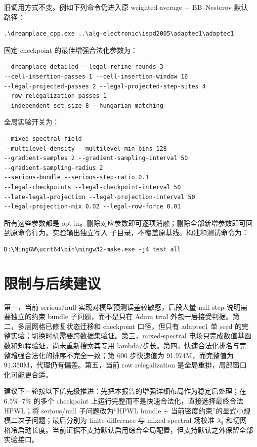 \documentclass[11pt,a4paper]{ctexart}
\newcommand{\code}[1]{\texttt{\detokenize{#1}}}
\begin{document}
旧调用方式不变。例如下列命令仍进入原 weighted-average + BB--Nesterov 默认路径：
\begin{verbatim}
.\dreamplace_cpp.exe ..\alg-electronic\ispd2005\adaptec1\adaptec1
\end{verbatim}

固定 checkpoint 的最佳增强合法化参数为：
\begin{verbatim}
--dreamplace-detailed --legal-refine-rounds 3
--cell-insertion-passes 1 --cell-insertion-window 16
--legal-projected-passes 2 --legal-projected-step-sites 4
--row-relegalization-passes 1
--independent-set-size 8 --hungarian-matching
\end{verbatim}

全局实验开关为：
\begin{verbatim}
--mixed-spectral-field
--multilevel-density --multilevel-min-bins 128
--gradient-samples 2 --gradient-sampling-interval 50
--gradient-sampling-radius 2
--serious-bundle --serious-step-ratio 0.1
--legal-checkpoints --legal-checkpoint-interval 50
--late-legal-projection --legal-projection-interval 50
--legal-projection-mix 0.02 --legal-row-force 0.01
\end{verbatim}

所有这些参数都是 opt-in。删除对应参数即可逐项消融；删除全部新增参数即可回到原命令行为。实验输出独立写入 \code{output/} 子目录，不覆盖原基线。构建和测试命令为：
\begin{verbatim}
D:\MingGW\ucrt64\bin\mingw32-make.exe -j4 test all
\end{verbatim}

\section{限制与后续建议}

第一，当前 serious/null 实现对模型预测误差较敏感，后段大量 null step 说明需要独立的约束 bundle 子问题，而不是只在 Adam trial 外包一层接受判据。第二，多层网格已修复状态迁移和 checkpoint 口径，但只有 adaptec1 单 seed 的完整实验；切换时机需要跨数据集验证。第三，mixed-spectral 电场只完成数值基函数和短程验证，尚未重新搜索其专用 lambda/步长。第四，快速合法化排名与完整增强合法化的排序不完全一致；第 600 步快速值为 91.974M，而完整值为 91.350M，代理仍有偏差。第五，当前 row relegalization 是全局重排，局部窗口化可能更合适。

建议下一轮按以下优先级推进：先把本报告的增强详细布局作为稳定后处理；在 6.5\%--7\% 的多个 checkpoint 上运行完整而不是快速合法化，直接选择最终合法 HPWL；将 serious/null 子问题改为“HPWL bundle + 当前密度约束”的显式小规模二次子问题；最后分别为 finite-difference 与 mixed-spectral 场校准 $\lambda_0$ 和切网格冷启动长度。当前证据不支持默认启用综合全局配置，但支持默认之外保留全部实验接口。
\end{document}
